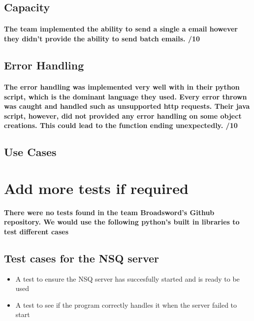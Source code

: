 \documentclass[11pt]{article}
\begin{document}
		\subsection{Capacity}
			\paragraph{The team implemented the ability to send a single a email however they didn't provide the ability to send batch emails. /10}
		\subsection{Error Handling}
		    \paragraph{The error handling was implemented very well with in their python script, which is the dominant language they used. Every error thrown was caught and handled such as unsupported http requests. Their java script, however, did not provided any error handling on some object creations. This could lead to the function ending unexpectedly. /10}
		\subsection{Use Cases} 
			\paragraph{}

	\section{Add more tests if required}
		\paragraph{There were no tests found in the team Broadsword's Github repository. We would use the following python's built in libraries to test different cases}
		\subsection{Test cases for the NSQ server}	
			\begin{itemize}
				\item A test to ensure the NSQ server has succesfully started and is ready to be used
				\item A test to see if the program correctly handles it when the server failed to start
			\end{itemize}
\end{document}
